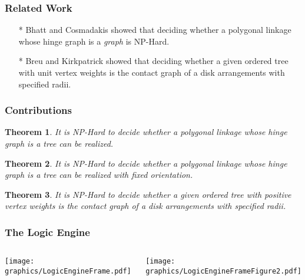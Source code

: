 \documentclass{beamer}
\newtheorem{thm}{Theorem}
\begin{document}
\begin{frame} \frametitle{Related Work}

\begin{itemize}
	\item[*] Bhatt and Cosmadakis showed that deciding whether a polygonal linkage whose hinge graph is a \textit{graph} is NP-Hard.
	\item[*] Breu and Kirkpatrick showed that deciding whether a given ordered tree with unit vertex weights is the contact graph of a disk arrangements with specified radii.
\end{itemize}
        
\end{frame}

\begin{frame}\frametitle{Contributions}
     \begin{thm}
     It is NP-Hard to decide whether a polygonal linkage whose hinge graph is a \textit{tree} can be realized.
     \end{thm}
    \begin{thm} It is NP-Hard to decide whether a polygonal linkage whose hinge graph is a \textit{tree} can be realized with fixed orientation.
    \end{thm}
    \begin{thm} It is NP-Hard to decide whether a given ordered tree with positive vertex weights is the contact graph of a disk arrangements with specified radii.
    \end{thm}
\end{frame}

\begin{frame} \frametitle{The Logic Engine}
    \begin{columns}[c]
        \begin{minipage}{\linewidth}
            \begin{center}
            \texttt{[image: graphics/LogicEngineFrame.pdf]}
            \end{center}
        \end{minipage}
        \begin{minipage}{\linewidth}
            \begin{center}
            \texttt{[image: graphics/LogicEngineFrameFigure2.pdf]}
            \end{center}
        \end{minipage}
    \end{columns}
\end{frame}
\end{document}
